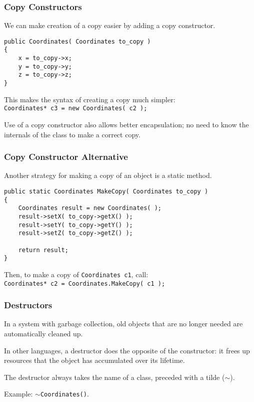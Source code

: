 \begin{frame}[fragile]
\frametitle{Copy Constructors}
We can make creation of a copy easier by adding a \alert{copy constructor}.

\begin{verbatim}
public Coordinates( Coordinates to_copy )
{
    x = to_copy->x;
    y = to_copy->y;
    z = to_copy->z;
}
\end{verbatim}

This makes the syntax of creating a copy much simpler:\\
\quad \texttt{Coordinates* c3 = new Coordinates( c2 );}

Use of a copy constructor also allows better encapsulation; no need to know the internals of the class to make a correct copy.

\end{frame}

\begin{frame}[fragile]
\frametitle{Copy Constructor Alternative}
Another strategy for making a copy of an object is a static method.

\begin{verbatim}
public static Coordinates MakeCopy( Coordinates to_copy )
{
    Coordinates result = new Coordinates( );
    result->setX( to_copy->getX() );
    result->setY( to_copy->getY() );
    result->setZ( to_copy->getZ() );

    return result;
}
\end{verbatim}


Then, to make a copy of \texttt{Coordinates c1}, call:\\
\quad \texttt{Coordinates* c2 = Coordinates.MakeCopy( c1 );}

\end{frame}

\begin{frame}
\frametitle{Destructors}


In a system with garbage collection, old objects that are no longer needed are automatically cleaned up.

In other languages, a destructor does the opposite of the constructor: it frees up resources that the object has accumulated over its lifetime.

The destructor always takes the name of a class, preceded with a tilde (\texttt{$\sim$}).

Example: \texttt{$\sim$Coordinates()}.

\end{frame}



